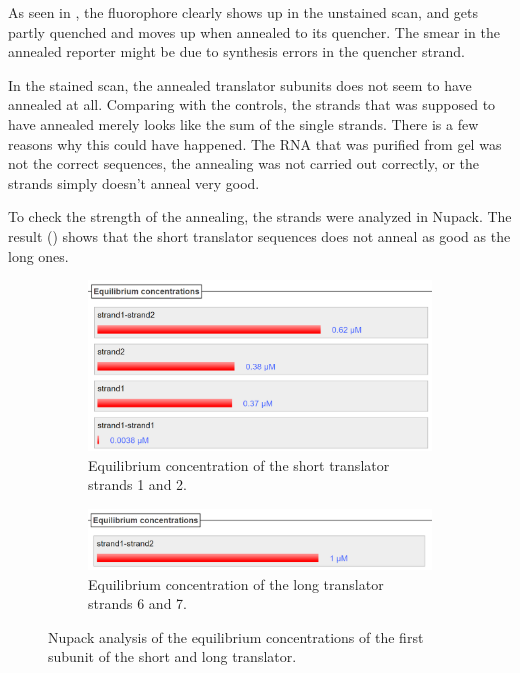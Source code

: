 As seen in , the fluorophore clearly shows up in the unstained scan, and gets partly quenched and moves up when annealed to its quencher. The smear in the annealed reporter might be due to synthesis errors in the quencher strand.

In the stained scan, the annealed translator subunits does not seem to have annealed at all. Comparing with the controls, the strands that was supposed to have annealed merely looks like the sum of the single strands. There is a few reasons why this could have happened. The RNA that was purified from gel was not the correct sequences, the annealing was not carried out correctly, or the strands simply doesn't anneal very good.

To check the strength of the annealing, the strands were analyzed in Nupack. The result () shows that the short translator sequences does not anneal as good as the long ones.

\begin{figure}
\begin{subfigure}{.49\columnwidth}
  \centering
  \includegraphics[width=\linewidth]{images/short_annealing_concentration.png}
  \caption{Equilibrium concentration of the short translator strands 1 and 2.}
\end{subfigure}
\hfill
\begin{subfigure}{.49\columnwidth}
  \centering
  \includegraphics[width=\linewidth]{images/long_annealing_concentration.png}
  \caption{Equilibrium concentration of the long translator strands 6 and 7.}
\end{subfigure}
\caption{Nupack analysis of the equilibrium concentrations of the first subunit of the short and long translator.}
\label{annealing_concentration}
\end{figure}

